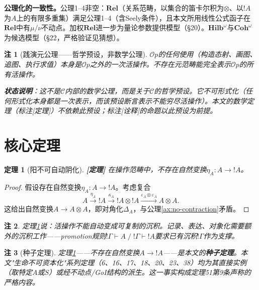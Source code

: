 \documentclass[11pt,a4paper]{article}
\newtheorem{theorem}{定理}
\newtheorem{remark}{注}
\newcommand{\lvl}[1]{\hfill\textbf{\footnotesize[#1]}}
\newcommand{\lvP}{\lvl{定理}}
\newcommand{\cat}[1]{\mathcal{#1}}
\newcommand{\Op}{\cat{O}\!p}
\newcommand{\C}{\cat{C}}
\newcommand{\bang}{{!}}
\newcommand{\tensor}{\otimes}
\newcommand{\eps}{\varepsilon}
\begin{document}
\noindent\textbf{公理化的一致性。}公理1--4非空：$\mathbf{Rel}$（关系范畴，以集合的笛卡尔积为$\tensor$、以$\bang A$为$A$上的有限多重集）满足公理1--4（含Seely条件），且本文所用线性公式函子在$\mathbf{Rel}$中有$\mu/\nu$不动点。加权$\mathbf{Rel}$进一步为量论参数提供模型（§20）。$\mathbf{Hilb}^\omega$与$\mathbf{Coh}^\omega$为候选模型（§22，严格验证见猜想）。

\begin{remark}[践演元公理——哲学预设，非数学公理]\label{ax:performative}
$\Op$的任何使用（构造态射、画图、追图、执行求值）本身是$\Op$之外的一次活操作。不存在元范畴能完全表示$\Op$的所有活操作。

\textbf{状态说明}：这不是$\C$内部的数学公理，而是关于$\C$的哲学预设。它不可形式化（任何形式化本身都是一次表示，而该预设断言表示不能穷尽活操作）。本文的数学定理（标注[定理]）不依赖此预设；标注[诠释]的命题以此预设为前提。
\end{remark}

\section{核心定理}

\begin{theorem}[阳不可自动阴化]\label{thm:no-A-to-bangA}\lvP
在操作范畴中，不存在自然变换$\eta_A : A \to \bang A$。
\end{theorem}

\begin{proof}
假设存在自然变换$\eta_A : A \to \bang A$。考虑复合
$$A \xrightarrow{\eta_A} \bang A \xrightarrow{\kappa_A} \bang A\tensor\bang A \xrightarrow{\eps_A\tensor\eps_A} A\tensor A.$$
这给出自然变换$A\to A\tensor A$，即对角化$\Delta_A$，与公理\ref{ax:no-contraction}矛盾。
\end{proof}

\begin{remark}
定理\ref{thm:no-A-to-bangA}说：活操作不能自动变成可复制的沉积。记录、表达、对象化需要额外的沉积工作——promotion规则$\bang\Gamma\vdash A \;/\; \bang\Gamma\vdash\bang A$要求已有沉积$\bang\Gamma$作为支撑。
\end{remark}

\begin{remark}[种子定理]\label{rmk:seed}
定理\ref{thm:no-A-to-bangA}——不存在自然变换$A\to\bang A$——是本文的\textbf{种子定理}。本文"生命不可资本化"系列定理（6、16、17、18、20、23、38）均为其直接实例（取特定$A$或$S$）或经不动点/GoI结构的派生。这一事实构成定理51第9条声称的严格内容。
\end{remark}
\end{document}
